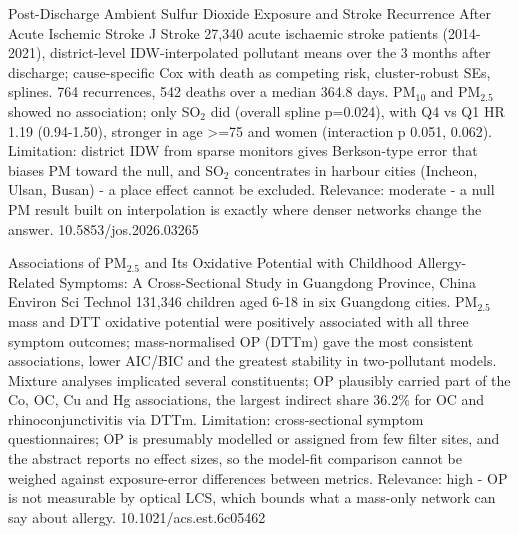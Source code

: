 \documentclass[10pt]{article}
\begin{document}
\par{}\baselineskip{}\baselineskip
{}

{Post-Discharge Ambient Sulfur Dioxide Exposure and Stroke Recurrence After Acute Ischemic Stroke}
{J Stroke}
{27,340 acute ischaemic stroke patients (2014-2021), district-level IDW-interpolated pollutant means over the 3 months after discharge; cause-specific Cox with death as competing risk, cluster-robust SEs, splines. 764 recurrences, 542 deaths over a median 364.8 days. PM$_{10}$ and PM$_{2.5}$ showed no association; only SO$_2$ did (overall spline p=0.024), with Q4 vs Q1 HR 1.19 (0.94-1.50), stronger in age >=75 and women (interaction p 0.051, 0.062). Limitation: district IDW from sparse monitors gives Berkson-type error that biases PM toward the null, and SO$_2$ concentrates in harbour cities (Incheon, Ulsan, Busan) - a place effect cannot be excluded. Relevance: moderate - a null PM result built on interpolation is exactly where denser networks change the answer.}
{10.5853/jos.2026.03265}

\par{}\baselineskip{}\baselineskip
{}

{Associations of PM$_{2.5}$ and Its Oxidative Potential with Childhood Allergy-Related Symptoms: A Cross-Sectional Study in Guangdong Province, China}
{Environ Sci Technol}
{131,346 children aged 6-18 in six Guangdong cities. PM$_{2.5}$ mass and DTT oxidative potential were positively associated with all three symptom outcomes; mass-normalised OP (DTTm) gave the most consistent associations, lower AIC/BIC and the greatest stability in two-pollutant models. Mixture analyses implicated several constituents; OP plausibly carried part of the Co, OC, Cu and Hg associations, the largest indirect share 36.2\% for OC and rhinoconjunctivitis via DTTm. Limitation: cross-sectional symptom questionnaires; OP is presumably modelled or assigned from few filter sites, and the abstract reports no effect sizes, so the model-fit comparison cannot be weighed against exposure-error differences between metrics. Relevance: high - OP is not measurable by optical LCS, which bounds what a mass-only network can say about allergy.}
{10.1021/acs.est.6c05462}
\end{document}
